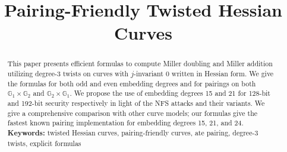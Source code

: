 \documentclass[11pt,runningheads]{llncs}
\newif\ifpublic
\begin{document}
\title{Pairing-Friendly Twisted Hessian Curves}


%

\author{}
\institute{}

\date{}
\maketitle

\vspace{-1cm}
\begin{abstract}
This paper presents efficient formulas to compute Miller doubling and Miller addition utilizing degree-3 twists on curves with $j$-invariant 0 written in Hessian form. 
We give the formulas for both odd and even embedding degrees and for pairings on both $\mathbb{G}_1 \times \mathbb{G}_2$ and $\mathbb{G}_{2} \times \mathbb{G}_{1}$.
We propose the use of embedding degrees 15 and 21 for 128-bit and 192-bit security respectively in light of the NFS attacks and their variants.
We give a comprehensive comparison with other curve models; our formulas 
give the fastest known pairing implementation
for embedding degrees 15, 21, and 24.
\\[10pt]
\textbf{Keywords:}
twisted Hessian curves, pairing-friendly curves, ate pairing, degree-3 twists, explicit formulas
\end{abstract}

\ifpublic
\begingroup
\makeatletter
\def\@thefnmark{} \@footnotetext{\relax
Chitchanok Chuengsatiansup acknowledges the support of Bpifrance
in the context of the national projet RISQ (P141580).
Chloe Martindale was supported by the Commission
of the European Communities through the Horizon 2020 program under
CHIST-ERA USEIT (NWO project 651.002.004).
}
\endgroup
\fi
\end{document}
